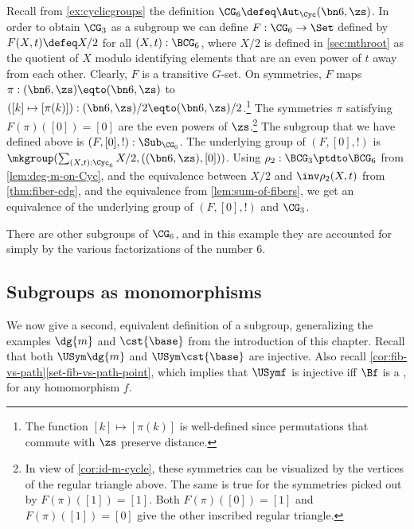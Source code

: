 \begin{example}
  \label{exa:C3subC6}%
Recall from \cref{ex:cyclicgroups} the definition 
$\CG_6\defeq\Aut_\Cyc(\bn6,\zs)$.
In order to obtain $\CG_3$ as a subgroup we can define
$F : \CG_6 \to \Set$ defined by $F(X,t) \defeq X/2$ for all $(X,t):\BCG_6$,
where $X/2$ is defined in \cref{sec:mthroot} as the quotient of $X$
modulo identifying elements that are an even power of $t$ away from each other.
Clearly, $F$ is a transitive $G$-set.
On symmetries, $F$ maps $\pi : (\bn6,\zs) \eqto (\bn6,\zs)$ to 
$([k] \mapsto [\pi(k)]) : (\bn6,\zs)/2 \eqto (\bn6,\zs)/2$.\footnote{%
The function $[k] \mapsto [\pi(k)]$ is well-defined since
permutations that commute with $\zs$ preserve distance.}
The symmetries $\pi$ satisfying $F(\pi)([0])=[0]$ are the
even powers of $\zs$.\footnote{%
In view of \cref{cor:id-m-cycle}, these symmetries can be visualized 
by the vertices of the regular triangle above.
The same is true for the symmetries picked out by $F(\pi)([1])=[1]$.
Both $F(\pi)([0])=[1]$ and $F(\pi)([1])=[0]$ give the other inscribed
regular triangle.} 
The subgroup that we have defined above is $(F,[0],!) : \Sub_{\CG_6}$.
The underlying group of $(F,[0],!)$ is 
$\mkgroup(\sum_{(X,t):\Cyc_6} X/2, ((\bn6,\zs),[0]))$.
Using $\rho_2: \BCG_3 \ptdto \BCG_6$ from \cref{lem:deg-m-on-Cyc},
and the equivalence between $X/2$ and $\inv\rho_2 (X,t)$ from
\cref{thm:fiber-cdg}, and the equivalence from \cref{lem:sum-of-fibers},
we get an equivalence of the underlying group of  $(F,[0],!)$ and $\CG_3$.
\end{example}

There are other subgroups of $\CG_6$, and in this example they are accounted for simply by the various factorizations of the number $6$.

\subsection{Subgroups as monomorphisms}

We now give a second, equivalent definition of a subgroup,
generalizing the examples $\dg{m}$ and $\cst{\base}$ from
the introduction of this chapter. Recall that both
$\USym\dg{m}$ and $\USym\cst{\base}$ are injective.
Also recall \cref{cor:fib-vs-path}\ref{set-fib-vs-path-point},
which implies that $\USymf$ is injective iff $\Bf$ is a \covering,
for any homomorphism $f$.


